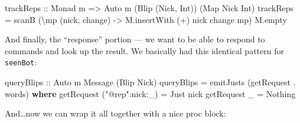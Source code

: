 \documentclass[]{article}
\newenvironment{Shaded}{}{}
\newcommand{\KeywordTok}[1]{\textcolor[rgb]{0.00,0.44,0.13}{\textbf{{#1}}}}
\newcommand{\DataTypeTok}[1]{\textcolor[rgb]{0.56,0.13,0.00}{{#1}}}
\newcommand{\StringTok}[1]{\textcolor[rgb]{0.25,0.44,0.63}{{#1}}}
\newcommand{\OtherTok}[1]{\textcolor[rgb]{0.00,0.44,0.13}{{#1}}}
\newcommand{\FunctionTok}[1]{\textcolor[rgb]{0.02,0.16,0.49}{{#1}}}
\newcommand{\NormalTok}[1]{{#1}}
\begin{document}
\begin{Shaded}
\begin{Highlighting}[]
\OtherTok{trackReps ::} \DataTypeTok{Monad} \NormalTok{m }\OtherTok{=>} \DataTypeTok{Auto} \NormalTok{m (}\DataTypeTok{Blip} \NormalTok{(}\DataTypeTok{Nick}\NormalTok{, }\DataTypeTok{Int}\NormalTok{)) (}\DataTypeTok{Map} \DataTypeTok{Nick} \DataTypeTok{Int}\NormalTok{)}
\NormalTok{trackReps }\FunctionTok{=} \NormalTok{scanB (\textbackslash{}mp (nick, change) }\OtherTok{->} \NormalTok{M.insertWith (}\FunctionTok{+}\NormalTok{) nick change mp) M.empty}
\end{Highlighting}
\end{Shaded}

And finally, the ``response'' portion --- we want to be able to respond to
commands and look up the result. We basically had this identical pattern for
\texttt{seenBot}:

\begin{Shaded}
\begin{Highlighting}[]
\OtherTok{queryBlips ::} \DataTypeTok{Auto} \NormalTok{m }\DataTypeTok{Message} \NormalTok{(}\DataTypeTok{Blip} \DataTypeTok{Nick}\NormalTok{)}
\NormalTok{queryBlips }\FunctionTok{=} \NormalTok{emitJusts (getRequest }\FunctionTok{.} \NormalTok{words)}
  \KeywordTok{where}
    \NormalTok{getRequest (}\StringTok{"@rep"}\FunctionTok{:}\NormalTok{nick}\FunctionTok{:}\NormalTok{_) }\FunctionTok{=} \DataTypeTok{Just} \NormalTok{nick}
    \NormalTok{getRequest _                }\FunctionTok{=} \DataTypeTok{Nothing}
\end{Highlighting}
\end{Shaded}

And\ldots{}now we can wrap it all together with a nice proc block:
\end{document}
